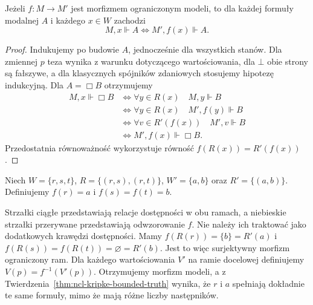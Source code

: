 \begin{twierdzenie}
\label{thm:ncl-kripke-bounded-truth}
Jeżeli $f:M\to M'$ jest morfizmem ograniczonym
modeli, to dla każdej formuły modalnej $A$
i każdego $x\in W$ zachodzi
\[
 M,x\Vdash A\iff M',f(x)\Vdash A.
\]
\end{twierdzenie}
\begin{proof}
Indukujemy po budowie $A$, jednocześnie
dla wszystkich stanów. Dla zmiennej $p$
teza wynika z warunku dotyczącego wartościowania,
dla $\bot$ obie strony są fałszywe,
a dla klasycznych spójników zdaniowych
stosujemy hipotezę indukcyjną.
Dla $A=\Box B$ otrzymujemy
\[
\begin{aligned}
 M,x\Vdash\Box B
 &\iff \forall y\in R(x)\quad M,y\Vdash B\\
 &\iff \forall y\in R(x)\quad M',f(y)\Vdash B\\
 &\iff \forall v\in R'(f(x))\quad M',v\Vdash B\\
 &\iff M',f(x)\Vdash\Box B.
\end{aligned}
\]
Przedostatnia równoważność wykorzystuje
równość $f(R(x))=R'(f(x))$.
\end{proof}

\begin{przyklad}
\label{ex:ncl-kripke-bounded-fold}
Niech $W=\{r,s,t\}$, $R=\{(r,s),(r,t)\}$,
$W'=\{a,b\}$ oraz $R'=\{(a,b)\}$.
Definiujemy $f(r)=a$ i $f(s)=f(t)=b$.
\begin{center}
\end{center}
Strzałki ciągłe przedstawiają relacje dostępności
w obu ramach, a niebieskie strzałki przerywane
przedstawiają odwzorowanie $f$. Nie należy ich
traktować jako dodatkowych krawędzi dostępności.
Mamy $f(R(r))=\{b\}=R'(a)$ i
$f(R(s))=f(R(t))=\varnothing=R'(b)$.
Jest to więc surjektywny morfizm ograniczony ram.
Dla każdego wartościowania $V'$ na ramie docelowej
definiujemy $V(p)=f^{-1}(V'(p))$.
Otrzymujemy morfizm modeli, a z
Twierdzenia~\ref{thm:ncl-kripke-bounded-truth}
wynika, że $r$ i $a$ spełniają dokładnie te same
formuły, mimo że mają różne liczby następników.
\end{przyklad}

